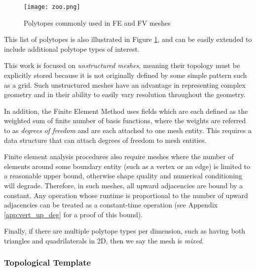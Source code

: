 \begin{figure}
\begin{center}
\texttt{[image: zoo.png]}
\caption{Polytopes commonly used in FE and FV meshes}
\label{fig:zoo}
\end{center}
\end{figure}

This list of polytopes is also illustrated in Figure
\ref{fig:zoo}, and
can be easily extended to include additional polytope
types of interest.

This work is focused on \emph{unstructured meshes}, meaning
their topology must be explicitly stored because it
is not originally defined by some simple pattern such as a grid.
Such unstructured meshes have an
advantage in representing complex geometry and in their
ability to easily vary resolution throughout the geometry.

In addition, the Finite Element Method uses fields which are each defined
as the weighted sum of finite number of basis functions,
where the weights are referred to as \emph{degrees of freedom} and are each
attached to one mesh entity.
This requires a data structure that can attach
degrees of freedom to mesh entities.

Finite element analysis procedures also require meshes where
the number of elements around some boundary entity (such as a vertex
or an edge) is limited to a reasonable upper bound,
otherwise shape quality and numerical conditioning will degrade.
Therefore, in such meshes, all upward adjacencies are bound
by a constant.
Any operation whose runtime is proportional to the
number of upward adjacencies can be treated as a constant-time operation
(see Appendix \ref{app:vert_up_deg} for a proof of this bound).

Finally, if there are multiple polytope types per dimension,
such as having both triangles and quadrilaterals in 2D, then
we say the mesh is {\it mixed}.

\subsubsection{Topological Template}
\label{sec:topo_template}

